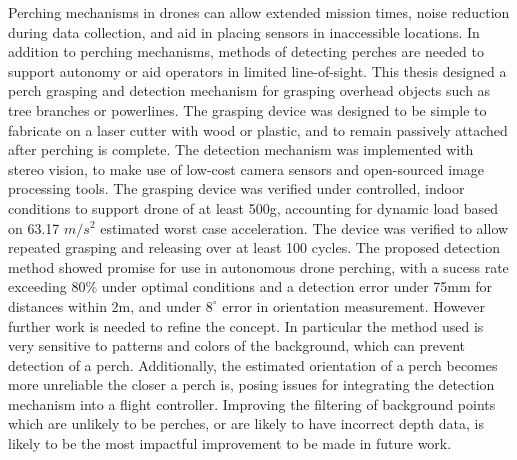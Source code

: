 Perching mechanisms in drones can allow extended mission times, noise reduction during data collection,
and aid in placing sensors in inaccessible locations. In addition to perching mechanisms, methods of detecting perches
are needed to support autonomy or aid operators in limited line-of-sight.
%
%
This thesis designed a perch grasping and detection mechanism for grasping overhead objects such as tree branches or
powerlines. The grasping device was designed to be simple to fabricate on a laser cutter with wood or plastic, and 
to remain passively attached after perching is complete. The detection mechanism was implemented with stereo vision, 
to make use of low-cost camera sensors and open-sourced image processing tools. 
%
%
The grasping device was verified under controlled, indoor conditions to support drone of at least 500g, accounting for 
dynamic load based on 63.17 $m/s^2$ estimated worst case acceleration. The device was verified to allow repeated
grasping and releasing over at least 100 cycles.
%
%
The proposed detection method showed promise for use in autonomous drone perching, with a sucess rate exceeding 
80\% under optimal conditions and a detection error under 75mm for distances within 2m, and under $8^\circ$
error in orientation measurement. However further work is needed to refine the concept. 
In particular the method used is very sensitive to patterns and colors of the background, which can 
prevent detection of a perch. Additionally, the estimated orientation of a perch becomes more unreliable the closer a perch is,
posing issues for integrating the detection mechanism into a flight controller. Improving the filtering of background 
points which are unlikely to be perches, or are likely to have incorrect depth data, is likely to be the 
most impactful improvement to be made in future work. 

